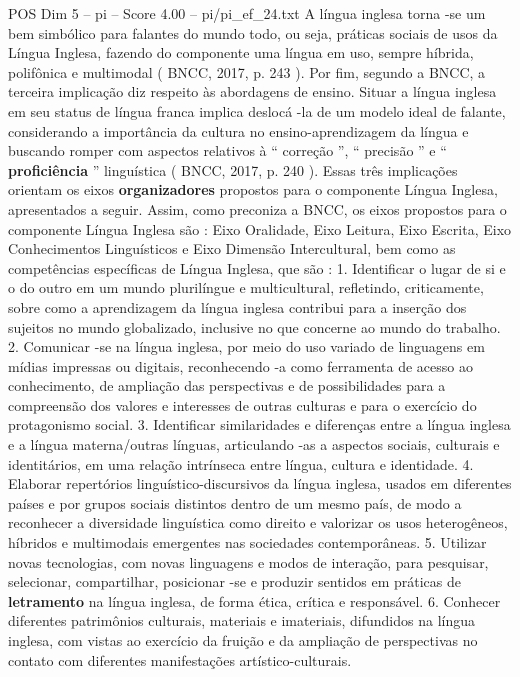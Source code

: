 \begin{textsample}{POS Dim 5 – pi – Score 4.00 – pi/pi\_ef\_24.txt}
A língua inglesa torna -se um bem simbólico para falantes do mundo todo, ou seja, práticas sociais de usos da Língua Inglesa, fazendo do componente uma língua em uso, sempre híbrida, polifônica e multimodal ( BNCC, 2017, p. 243 ).
Por fim, segundo a BNCC, a terceira implicação diz respeito às abordagens de ensino.
Situar a língua inglesa em seu status de língua franca implica deslocá -la de um modelo ideal de falante, considerando a importância da cultura no ensino-aprendizagem da língua e buscando romper com aspectos relativos à “ correção ”, “ precisão ” e “ \textbf{proficiência} ” linguística ( BNCC, 2017, p. 240 ).
Essas três implicações orientam os eixos \textbf{organizadores} propostos para o componente Língua Inglesa, apresentados a seguir.
Assim, como preconiza a BNCC, os eixos propostos para o componente Língua Inglesa são : Eixo Oralidade, Eixo Leitura, Eixo Escrita, Eixo Conhecimentos Linguísticos e Eixo Dimensão Intercultural, bem como as competências específicas de Língua Inglesa, que são : 1.
Identificar o lugar de si e o do outro em um mundo plurilíngue e multicultural, refletindo, criticamente, sobre como a aprendizagem da língua inglesa contribui para a inserção dos sujeitos no mundo globalizado, inclusive no que concerne ao mundo do trabalho. 2.
Comunicar -se na língua inglesa, por meio do uso variado de linguagens em mídias impressas ou digitais, reconhecendo -a como ferramenta de acesso ao conhecimento, de ampliação das perspectivas e de possibilidades para a compreensão dos valores e interesses de outras culturas e para o exercício do protagonismo social. 3.
Identificar similaridades e diferenças entre a língua inglesa e a língua materna/outras línguas, articulando -as a aspectos sociais, culturais e identitários, em uma relação intrínseca entre língua, cultura e identidade. 4.
Elaborar repertórios linguístico-discursivos da língua inglesa, usados em diferentes países e por grupos sociais distintos dentro de um mesmo país, de modo a reconhecer a diversidade linguística como direito e valorizar os usos heterogêneos, híbridos e multimodais emergentes nas sociedades contemporâneas. 5.
Utilizar novas tecnologias, com novas linguagens e modos de interação, para pesquisar, selecionar, compartilhar, posicionar -se e produzir sentidos em práticas de \textbf{letramento} na língua inglesa, de forma ética, crítica e responsável. 6.
Conhecer diferentes patrimônios culturais, materiais e imateriais, difundidos na língua inglesa, com vistas ao exercício da fruição e da ampliação de perspectivas no contato com diferentes manifestações artístico-culturais.

\end{textsample}
